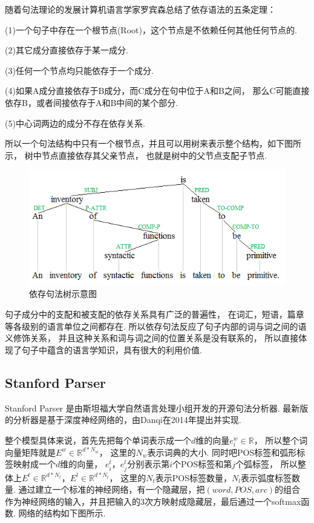 \documentclass[bachelor,adobefonts]{jnuthesis}
\begin{document}
随着句法理论的发展计算机语言学家罗宾森总结了依存语法的五条定理：

(1)一个句子中存在一个根节点(Root)，这个节点是不依赖任何其他任何节点的.

(2)其它成分直接依存于某一成分.

(3)任何一个节点均只能依存于一个成分.

(4)如果A成分直接依存于B成分，而C成分在句中位于A和B之间，
那么C可能直接依存B，或者间接依存于A和B中间的某个部分.

(5)中心词两边的成分不存在依存关系.

所以一个句法结构中只有一个根节点，并且可以用树来表示整个结构，如下图所示，
树中节点直接依存其父亲节点，
也就是树中的父节点支配子节点.

\begin{figure}[h!]
  \centering
  \includegraphics[width=0.6\linewidth]{依存句法树.png}
  \caption{依存句法树示意图}
\end{figure}

句子成分中的支配和被支配的依存关系具有广泛的普遍性，
在词汇，短语，篇章等各级别的语言单位之间都存在.
所以依存句法反应了句子内部的词与词之间的语义修饰关系，
并且这种关系和词与词之间的位置关系是没有联系的，
所以直接体现了句子中蕴含的语言学知识，具有很大的利用价值.

\subsection{Stanford Parser}
Stanford Parser 是由斯坦福大学自然语言处理小组开发的开源句法分析器.
最新版的分析器是基于深度神经网络的，由Danqi在2014年提出并实现\cite{The}.

整个模型具体来说，首先先把每个单词表示成一个$d$维的向量$e_{i}^{w} \in \mathbb{R}$，
所以整个词向量矩阵就是$E^{w} \in \mathbb{R}^{d*N_{w}}$，
这里的$N_{w}$表示词典的大小.
同时吧POS标签和弧形标签映射成一个$d$维的向量，
$e^{t}_{i}$，$e^{l}_{j}$分别表示第$i$个POS标签和第$j$个弧标签，
所以整体上$E^{t} \in \mathbb{R}^{d*N_{t}}$，$E^{l} \in \mathbb{R}^{d*N_{l}}$，
这里的$N_{t}$表示POS标签数量，$N_{l}$表示弧度标签数量.
通过建立一个标准的神经网络，有一个隐藏层，把$(word,POS,arc)$的组合
作为神经网络的输入，并且把输入的3次方映射成隐藏层，最后通过一个softmax函数.
网络的结构如下图所示.
\end{document}
